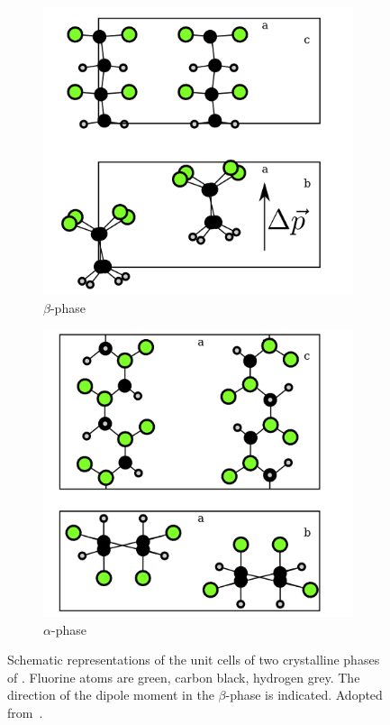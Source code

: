 \begin{figure}
\begin{subfigure}{0.5\textwidth}
\centering
	\includegraphics[width=0.8\linewidth]{./figs/chap1/betaunitcell}
	\caption{$\beta$-phase}
	\label{fig:betaunitcell}
\end{subfigure}
\begin{subfigure}{0.5\textwidth}
\centering
	\includegraphics[width=0.8\linewidth]{./figs/chap1/alphaunitcell}
	\caption{$\alpha$-phase}
	\label{fig:alphaunitcell}
\end{subfigure}
\caption{Schematic representations of the unit cells of two crystalline phases of \pvdf{}. Fluorine atoms are green, carbon black, hydrogen grey. The direction of the dipole moment in the $\beta$-phase is indicated. Adopted from~\cite[pp. 809 f.]{encyclopedia}.}
\label{fig:pvdfunit}
\end{figure}
